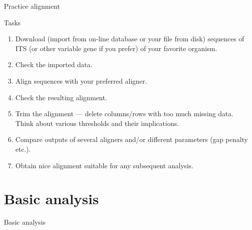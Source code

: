 \documentclass[compress, xelatex, 11pt, xcolor=svgnames, aspectratio=169,
	hyperref={
		bookmarks=true,
		unicode=true,
		colorlinks=true,
		pdftitle={Molecular data in R},
		plainpages=false,
		pdfauthor={Vojtech Zeisek},
		pdfsubject={Course about phylogeny and evolution in R},
		pdfcreator={XeLaTeX},
		pdfkeywords={R, evolution, phylogeny, molecular data},
		linkcolor=Crimson, %
		anchorcolor=Magenta, %
		citecolor=Magenta, %
		filecolor=Magenta, %
		menucolor=Magenta, %
		urlcolor=DodgerBlue, %
		},
	url={hyphens, lowtilde} %
	]{beamer}
\begin{document}
\begin{frame}[fragile]{Practice alignment}
	\begin{exampleblock}{Tasks}
		\begin{enumerate}
			\item Download (import from on-line database or your file from disk) sequences of ITS (or other variable gene if you prefer) of your favorite organism.
			\item Check the imported data.
			\item Align sequences with your preferred aligner.
			\item Check the resulting alignment.
			\item Trim the alignment --- delete columns/rows with too much missing data. Think about various thresholds and their implications.
			\item Compare outputs of several aligners and/or different parameters (gap penalty etc.).
			\item Obtain nice alignment suitable for any subsequent analysis.
		\end{enumerate}
	\end{exampleblock}
\end{frame}

\section{Basic analysis}

\begin{frame}{Basic analysis}
	\tableofcontents[currentsection, sectionstyle=show/hide, hideothersubsections]
\end{frame}
\end{document}
